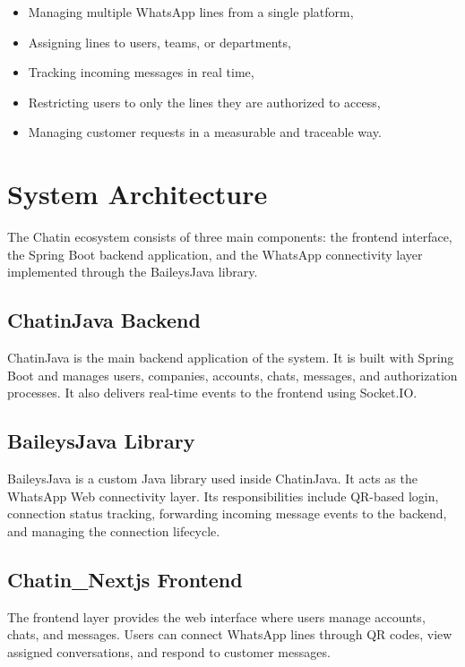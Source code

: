 \documentclass[12pt,a4paper]{article}
\begin{document}
\begin{itemize}
    \item Managing multiple WhatsApp lines from a single platform,
    \item Assigning lines to users, teams, or departments,
    \item Tracking incoming messages in real time,
    \item Restricting users to only the lines they are authorized to access,
    \item Managing customer requests in a measurable and traceable way.
\end{itemize}

\section{System Architecture}

The Chatin ecosystem consists of three main components: the frontend interface, the Spring Boot backend application, and the WhatsApp connectivity layer implemented through the BaileysJava library.

\subsection{ChatinJava Backend}

ChatinJava is the main backend application of the system. It is built with Spring Boot and manages users, companies, accounts, chats, messages, and authorization processes. It also delivers real-time events to the frontend using Socket.IO.

\subsection{BaileysJava Library}

BaileysJava is a custom Java library used inside ChatinJava. It acts as the WhatsApp Web connectivity layer. Its responsibilities include QR-based login, connection status tracking, forwarding incoming message events to the backend, and managing the connection lifecycle.

\subsection{Chatin\_Nextjs Frontend}

The frontend layer provides the web interface where users manage accounts, chats, and messages. Users can connect WhatsApp lines through QR codes, view assigned conversations, and respond to customer messages.
\end{document}
